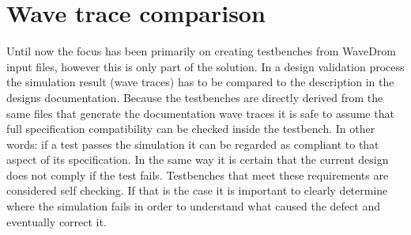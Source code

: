 \section{Wave trace comparison}
Until now the focus has been primarily on creating testbenches from WaveDrom input files, however this is only part of the solution. In a design validation process the simulation result (wave traces) has to be compared to the description in the designs documentation.
\npar
Because the testbenches are directly derived from the same files that generate the documentation wave traces it is safe to assume that full specification compatibility can be checked inside the testbench. In other words: if a test passes the simulation it can be regarded as compliant to that aspect of its specification. In the same way it is certain that the current design does not comply if the test fails. Testbenches that meet these requirements are considered self checking. If that is the case it is important to clearly determine where the simulation fails in order to understand what caused the defect and eventually correct it.
